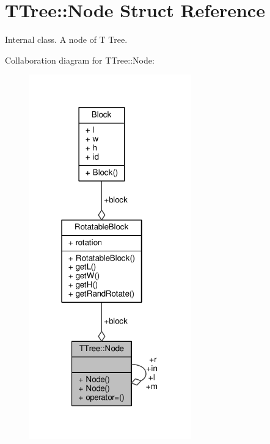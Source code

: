 \hypertarget{structTTree_1_1Node}{}\section{T\+Tree\+:\+:Node Struct Reference}
\label{structTTree_1_1Node}


Internal class. A node of T Tree.  




Collaboration diagram for T\+Tree\+:\+:Node\+:\nopagebreak
\begin{figure}[H]
\begin{center}
\leavevmode
\includegraphics[width=199pt]{structTTree_1_1Node__coll__graph}
\end{center}
\end{figure}
